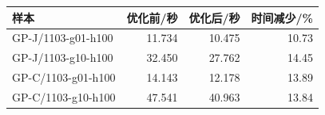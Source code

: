 \begin{tabular}{@{}lrrr@{}}
\toprule
样本 & 优化前/秒 & 优化后/秒 & 时间减少/\% \\ \midrule
GP-J/1103-g01-h100 & 11.734 & 10.475 & 10.73 \\
GP-J/1103-g10-h100 & 32.450 & 27.762 & 14.45 \\
GP-C/1103-g01-h100 & 14.143 & 12.178 & 13.89 \\
GP-C/1103-g10-h100 & 47.541 & 40.963 & 13.84 \\
\bottomrule
\end{tabular}
